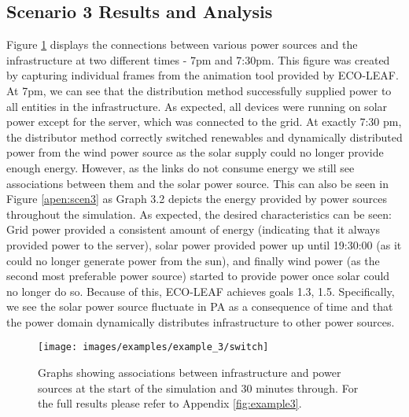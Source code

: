 \documentclass{l4proj}
\begin{document}
\subsection{Scenario 3 Results and Analysis}
Figure \ref{fig:example2_switch} displays the connections between various power sources and the infrastructure at two different times - 7pm and 7:30pm.
This figure was created by capturing individual frames from the animation tool provided by ECO-LEAF.
At 7pm, we can see that the distribution method successfully supplied power to all entities in the infrastructure.
As expected, all devices were running on solar power except for the server, which was connected to the grid.
At exactly 7:30 pm, the distributor method correctly switched renewables and dynamically distributed power from the wind power source as the solar supply could no longer provide enough energy.
However, as the links do not consume energy we still see associations between them and the solar power source.
This can also be seen in Figure \ref{apen:scen3} as Graph 3.2 depicts the energy provided by power sources throughout the simulation.
As expected, the desired characteristics can be seen: Grid power provided a consistent amount of energy (indicating that it always provided power to the server), solar power provided power up until 19:30:00 (as it could no longer generate power from the sun), and finally wind power (as the second most preferable power source) started to provide power once solar could no longer do so.
Because of this, ECO-LEAF achieves goals 1.3, 1.5.
Specifically, we see the solar power source fluctuate in PA as a consequence of time and that the power domain dynamically distributes infrastructure to other power sources.
\begin{figure}
    \centering
    \texttt{[image: images/examples/example\_3/switch]}
    \caption{Graphs showing associations between infrastructure and power sources at the start of the simulation and 30 minutes through. For the full results please refer to Appendix \ref{fig:example3}.}
    \label{fig:example2_switch}
\end{figure}
\end{document}
